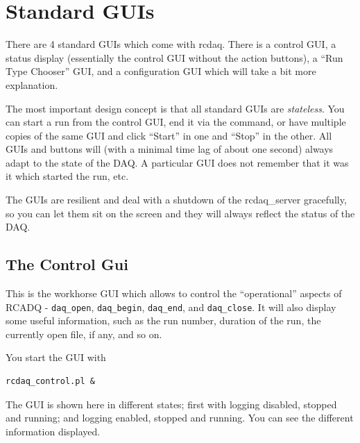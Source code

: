 \documentclass{article}[11pt]
\begin{document}
\section{Standard GUIs}
\label{GUI}
There are 4 standard GUIs which come with rcdaq. There is a control
GUI, a status display (essentially the control GUI without the action
buttons), a ``Run Type Chooser'' GUI, and a configuration GUI which
will take a bit more explanation. 

The most important design concept is that all standard GUIs are
\emph{stateless}. You can start a run from the control GUI, end it via
the command, or have multiple copies of the same GUI and click
``Start'' in one and ``Stop'' in the other. All GUIs and buttons will
(with a minimal time lag of about one second) always adapt to the
state of the DAQ. A particular GUI does not remember that it was it
which started the run, etc. 

The GUIs are resilient and deal with a shutdown of the rcdaq\_server
gracefully, so you can let them sit on the screen and they will always
reflect the status of the DAQ.

\subsection{The Control Gui}

This is the workhorse GUI which allows to control the ``operational''
aspects of RCADQ - \verb|daq_open|, \verb|daq_begin|, \verb|daq_end|,
and \verb|daq_close|.  It will also display some useful information, such
as the run number, duration of the run, the currently open file, if
any, and so on.

You start the GUI with 

\begin{verbatim}
rcdaq_control.pl &
\end{verbatim}

The GUI is shown here in different states; first with logging disabled,
stopped and running; and logging enabled, stopped and running. You can see the 
different information displayed. 
\end{document}

